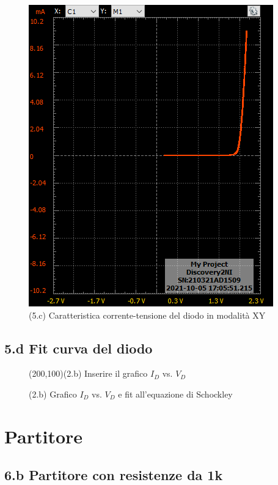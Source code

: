 \documentclass[10pt,a4paper]{article}
\begin{document}
\begin{figure}[h]
\centering
\includegraphics[scale=0.4]{shockley}
\caption{(5.c) Caratteristica corrente-tensione del diodo in modalit\`a XY}
\end{figure}

\subsection*{5.d Fit curva del diodo}
\par

\begin{figure}[h]
\centering
\framebox(200,100){(2.b) Inserire il grafico $I_{D}$ vs. $V_{D}$ }
\caption{(2.b) Grafico $I_{D}$ vs. $V_{D}$ e fit all'equazione di Schockley}
\end{figure}







\section{Partitore}

\subsection*{6.b Partitore con resistenze da 1k}
\end{document}
